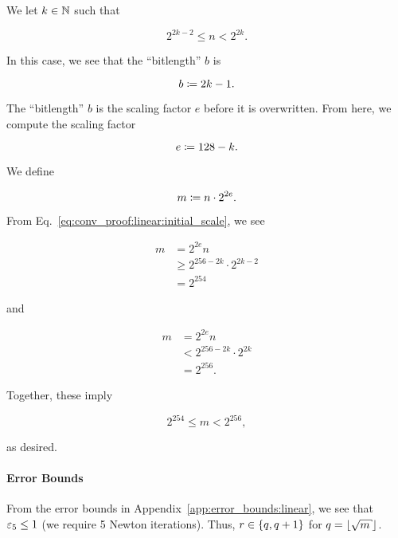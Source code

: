 We let $k\in\mathbb{N}$ such that

\begin{equation}
    2^{2k-2} \le n < 2^{2k}.
    \label{eq:conv_proof:linear:initial_scale}
\end{equation}

\noindent
In this case, we see that the ``bitlength'' $b$ is

\begin{equation}
    b \coloneqq{} 2k-1.
\end{equation}

\noindent
The ``bitlength'' $b$ is the scaling factor $e$ before it is overwritten.
From here, we compute the scaling factor

\begin{equation}
    e \coloneqq{} 128 - k.
\end{equation}

\noindent
We define

\begin{equation}
    m \coloneqq{} n \cdot 2^{2e}.
\end{equation}

\noindent
From Eq.~\eqref{eq:conv_proof:linear:initial_scale},
we see

\begin{align}
    m &= 2^{2e}n \nonumber\\
        &\ge 2^{256 - 2k} \cdot 2^{2k-2} \nonumber\\
        &= 2^{254}
\end{align}

\noindent
and

\begin{align}
    m &= 2^{2e}n \nonumber\\
        &< 2^{256 - 2k} \cdot 2^{2k} \nonumber\\
        &= 2^{256}.
\end{align}

\noindent
Together, these imply

\begin{equation}
    2^{254} \le m < 2^{256},
\end{equation}

\noindent
as desired.

\paragraph{Error Bounds}
From the error bounds in Appendix~\ref{app:error_bounds:linear},
we see that $\varepsilon_{5}\le1$ (we require 5 Newton iterations).
Thus, $r\in\left\{ q,q+1 \right\}$ for $q = \floor{\sqrt{m}}$.

